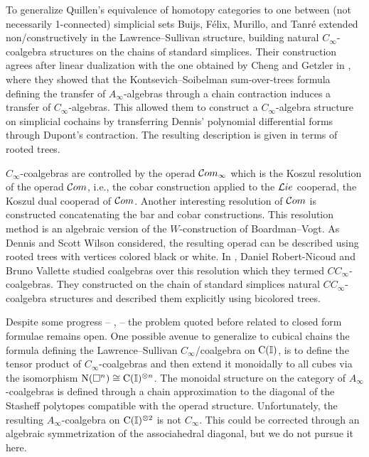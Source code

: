 To generalize Quillen's equivalence of homotopy categories to one between (not necessarily 1-connected) simplicial sets Buijs, F{\'e}lix, Murillo, and Tanr{\'e} extended non\-/constructively in \cite{buijs2020liemodels} the Lawrence--Sullivan structure, building natural $C_\infty$-coalgebra structures on the chains of standard simplices.
Their construction agrees after linear dualization with the one obtained by Cheng and Getzler in \cite{getzler2008transfering}, where they showed that the Kontsevich--Soibelman sum-over-trees formula defining the transfer of $A_\infty$-algebras through a chain contraction induces a transfer of $C_\infty$-algebras.
This allowed them to construct a $C_\infty$-algebra structure on simplicial cochains by transferring Dennis' polynomial differential forms through Dupont's contraction.
The resulting description is given in terms of rooted trees.

$C_\infty$-coalgebras are controlled by the operad $\mathcal{C}om_\infty$ which is the Koszul resolution of the operad $\mathcal{C}om$, i.e., the cobar construction applied to the $\mathcal{L}ie$ cooperad, the Koszul dual cooperad of $\mathcal{C}om$.
Another interesting resolution of $\mathcal{C}om$ is constructed concatenating the bar and cobar constructions.
This resolution method is an algebraic version of the $W$-construction of Boardman--Vogt.
As Dennis and Scott Wilson considered, the resulting operad can be described using rooted trees with vertices colored black or white.
In \cite{vallette2020higherlietheory}, Daniel Robert-Nicoud and Bruno Vallette studied coalgebras over this resolution which they termed $CC_\infty$-coalgebras.
They constructed on the chain of standard simplices natural $CC_\infty$-coalgebra structures and described them explicitly using bicolored trees.

Despite some progress -- \cite{lawrence2019triangle, lawrence2021cells}, \cite[\S6.5]{buijs2020liemodels} -- the problem quoted before related to closed form formulae remains open.
One possible avenue to generalize to cubical chains the formula defining the Lawrence--Sullivan $C_\infty$\-/coalgebra on $\operatorname{C}(\mathbb{I})$, is to define the tensor product of $C_\infty$-coalgebras and then extend it monoidally to all cubes via the isomorphism $\operatorname{N}(\square^n) \cong \operatorname{C}(\mathbb{I})^{\otimes n}$.
The monoidal structure on the category of $A_\infty$-coalgebras is defined through a chain approximation to the diagonal of the Stasheff polytopes compatible with the operad structure.
Unfortunately, the resulting $A_\infty$-coalgebra on $\operatorname{C}(\mathbb{I})^{\otimes 2}$ is not $C_\infty$.
This could be corrected through an algebraic symmetrization of the associahedral diagonal, but we do not pursue it here.


